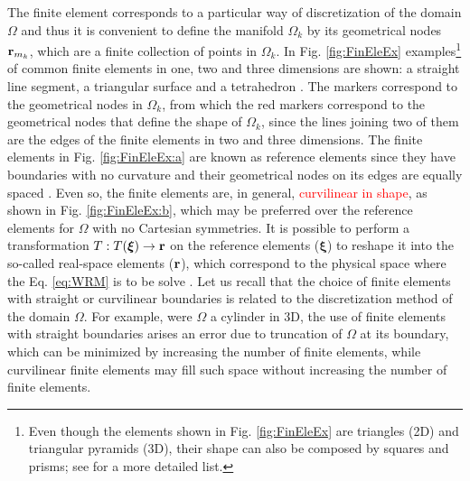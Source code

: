 %
%
%
The finite element corresponds to a particular way of discretization of the domain $\Omega$ and thus it is convenient to define the manifold $\Omega_k$ by its geometrical nodes $\vb{r}_{m_k}$, which are a finite collection of  points in $\Omega_k$. In Fig. \ref{fig:FinEleEx} examples\footnote{Even though the elements shown in Fig. \ref{fig:FinEleEx} are triangles (2D) and  triangular pyramids (3D), their shape can also be composed by squares and prisms; see \cite{dhatt_finite_2012} for a more detailed list.} of common finite elements in one, two and three dimensions are shown: a straight line segment, a triangular surface and a tetrahedron \cite{dhatt_finite_2012}. The markers correspond to the geometrical nodes in $\Omega_k$, from which the red markers correspond to the geometrical nodes that define the shape of $\Omega_k$, since the lines joining two of them are the edges of the finite elements in two and three dimensions. The finite elements in Fig. \ref{fig:FinEleEx:a} are known as reference elements since they have boundaries with no curvature and their geometrical nodes on its edges are equally spaced \cite{dhatt_finite_2012,larson_finite_2013}.   Even so, the finite elements are, in general, \textcolor{red}{curvilinear in shape}, as shown in Fig. \ref{fig:FinEleEx:b},  which may be preferred over the reference elements for $\Omega$ with no Cartesian symmetries. It is possible to perform a transformation $T:T(\boldsymbol{\xi})\to\vb{r}$ on the reference elements ($\boldsymbol{\xi}$) to reshape it into the so-called real-space elements ($\vb{r}$), which correspond to the physical space where the Eq. \eqref{eq:WRM} is to be solve \cite{dhatt_finite_2012,fletcher_computational_1984}.  Let us recall that the choice of finite elements with straight or curvilinear boundaries is related to the discretization method of the domain $\Omega$. For example, were $\Omega$ a cylinder in 3D, the use of finite elements with straight boundaries arises an error due to truncation of $\Omega$ at its boundary, which can be minimized by increasing the number of finite elements, while curvilinear finite elements may fill such space without increasing the number of finite elements.

